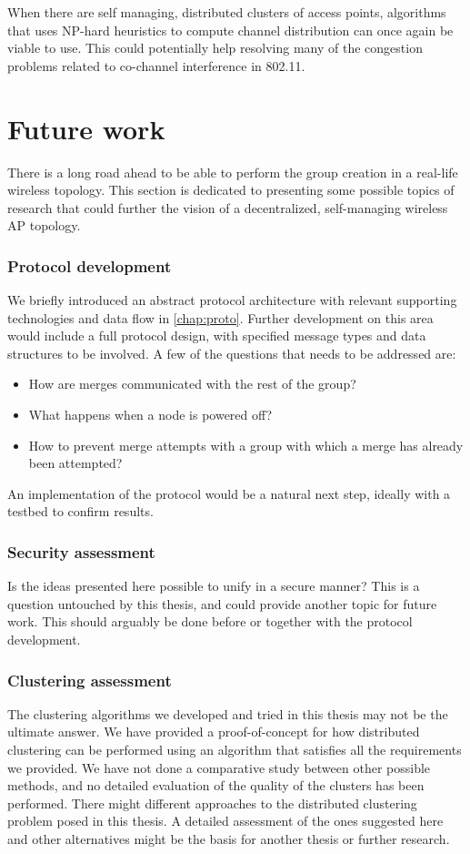 When there are self managing, distributed clusters of access points, algorithms that uses NP-hard heuristics to compute channel distribution can once again be viable to use. This could
potentially help resolving many of the congestion problems related to co-channel interference in 802.11.

\section{Future work}
There is a long road ahead to be able to perform the group creation in a real-life wireless topology. This section is dedicated to presenting some possible topics of research
that could further the vision of a decentralized, self-managing wireless AP topology. 

\subsubsection{Protocol development}
We briefly introduced an abstract protocol architecture with relevant supporting technologies and data flow in \ref{chap:proto}. Further development on this area would include a full protocol design, with
specified message types and data structures to be involved. A few of the questions that needs to be addressed are: 
\begin{itemize}
	\item How are merges communicated with the rest of the group?
	\item What happens when a node is powered off?
	\item How to prevent merge attempts with a group with which a merge has already been attempted?
\end{itemize}

An implementation of the protocol would be a natural next step, ideally with a testbed to confirm results. 

\subsubsection{Security assessment}
Is the ideas presented here possible to unify in a secure manner? This is a question untouched by this thesis, and could provide another topic for future work. This should arguably 
be done before or together with the protocol development. 

\subsubsection{Clustering assessment}
The clustering algorithms we developed and tried in this thesis may not be the ultimate answer. We have provided a proof-of-concept for how distributed clustering can be performed using
an algorithm that satisfies all the requirements we provided. We have not done a comparative study between other possible methods, and no detailed evaluation of the quality of the clusters has been performed. There might different approaches to the distributed clustering problem posed in this thesis. A detailed assessment of the ones suggested here and other alternatives might be the basis for another thesis or further research.

